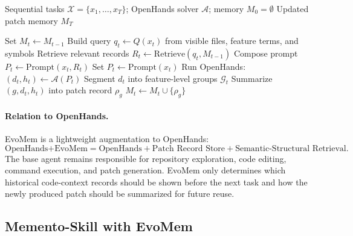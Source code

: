 \documentclass{article}
\begin{document}
\begin{algorithm}[H]
\caption{EvoMem: Patch Memory for OpenHands}
\label{alg:evomem_openhands}
\begin{algorithmic}[1]
\Require Sequential tasks $\mathcal{X}=\{x_1,\ldots,x_T\}$; OpenHands solver $\mathcal{A}$; memory $M_0=\emptyset$
\Ensure Updated patch memory $M_T$

    \State Set $M_t\leftarrow M_{t-1}$
    \State Build query $q_t\leftarrow Q(x_t)$ from visible files, feature terms, and symbols
    \State Retrieve relevant records $R_t\leftarrow \mathrm{Retrieve}(q_t,M_{t-1})$
        \State Compose prompt $P_t\leftarrow \mathrm{Prompt}(x_t,R_t)$
    \Else
        \State Set $P_t\leftarrow \mathrm{Prompt}(x_t)$
    \EndIf
    \State Run OpenHands: $(d_t,h_t)\leftarrow \mathcal{A}(P_t)$
    \State Segment $d_t$ into feature-level groups $\mathcal{G}_t$
        \State Summarize $(g,d_t,h_t)$ into patch record $\rho_g$
        \State $M_t\leftarrow M_t\cup\{\rho_g\}$
    \EndFor
\EndFor
\end{algorithmic}
\end{algorithm}

\paragraph{Relation to OpenHands.}
EvoMem is a lightweight augmentation to OpenHands:
\[
\text{OpenHands+EvoMem}
=
\text{OpenHands}
+
\text{Patch Record Store}
+
\text{Semantic-Structural Retrieval}.
\]
The base agent remains responsible for repository exploration, code editing, command execution, and patch generation. EvoMem only determines which historical code-context records should be shown before the next task and how the newly produced patch should be summarized for future reuse.











\subsection{Memento-Skill with EvoMem}
\label{sec:evomem_memento}



\end{document}

